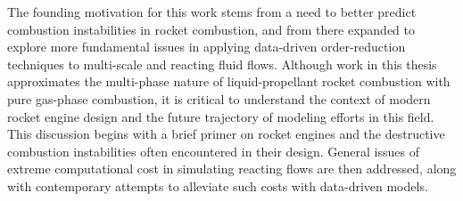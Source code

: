 The founding motivation for this work stems from a need to better predict combustion instabilities in rocket combustion, and from there expanded to explore more fundamental issues in applying data-driven order-reduction techniques to multi-scale and reacting fluid flows. Although work in this thesis approximates the multi-phase nature of liquid-propellant rocket combustion with pure gas-phase combustion, it is critical to understand the context of modern rocket engine design and the future trajectory of modeling efforts in this field. This discussion begins with a brief primer on rocket engines and the destructive combustion instabilities often encountered in their design. General issues of extreme computational cost in simulating reacting flows are then addressed, along with contemporary attempts to alleviate such costs with data-driven models.
